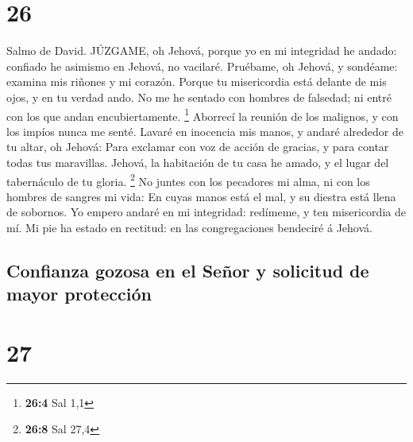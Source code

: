 \hypertarget{section-25}{%
\section{26}\label{section-25}}

 Salmo de David. JÚZGAME, oh Jehová, porque yo en mi
integridad he andado: confiado he asimismo en Jehová, no vacilaré.
 Pruébame, oh Jehová, y sondéame: examina mis riñones y mi
corazón.  Porque tu misericordia está delante de mis ojos, y
en tu verdad ando.  No me he sentado con hombres de
falsedad; ni entré con los que andan encubiertamente. \footnote{\textbf{26:4}
  Sal 1,1}  Aborrecí la reunión de los malignos, y con los
impíos nunca me senté.  Lavaré en inocencia mis manos, y
andaré alrededor de tu altar, oh Jehová:  Para exclamar con
voz de acción de gracias, y para contar todas tus maravillas.
 Jehová, la habitación de tu casa he amado, y el lugar del
tabernáculo de tu gloria. \footnote{\textbf{26:8} Sal 27,4} 
No juntes con los pecadores mi alma, ni con los hombres de sangres mi
vida:  En cuyas manos está el mal, y su diestra está llena
de sobornos.  Yo empero andaré en mi integridad: redímeme,
y ten misericordia de mí.  Mi pie ha estado en rectitud: en
las congregaciones bendeciré á Jehová.

\hypertarget{confianza-gozosa-en-el-seuxf1or-y-solicitud-de-mayor-protecciuxf3n}{%
\subsection{Confianza gozosa en el Señor y solicitud de mayor
protección}\label{confianza-gozosa-en-el-seuxf1or-y-solicitud-de-mayor-protecciuxf3n}}

\hypertarget{section-26}{%
\section{27}\label{section-26}}

